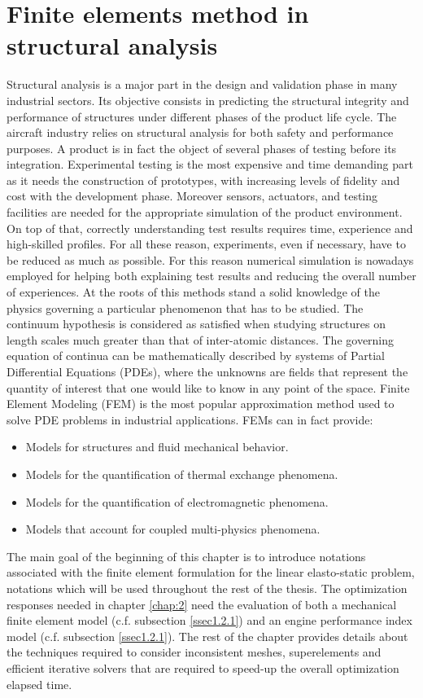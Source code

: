 \section{Finite elements method in structural analysis }
\label{sec:1.1}
Structural analysis is a major part in the design and validation phase in many industrial sectors. Its objective consists in predicting the structural integrity and performance of structures under different phases of the product life cycle.
The aircraft industry relies on structural analysis for both safety and performance purposes. A product is in fact the object of several phases of testing before its integration.
Experimental testing is the most expensive and time demanding part as it needs the construction of prototypes, with increasing levels of fidelity and cost with the development phase. Moreover sensors, actuators, and testing facilities are needed for the appropriate simulation of the product environment.
On top of that, correctly understanding test results requires time, experience and high-skilled profiles. 
For all these reason, experiments, even if necessary, have to be reduced as much as possible. For this reason numerical simulation is nowadays employed for helping both explaining test results and reducing the overall number of experiences. 
At the roots of this methods stand a solid knowledge of the physics governing a particular phenomenon that has to be studied. 
The continuum hypothesis is considered as satisfied when studying structures on length scales much greater than that of inter-atomic distances. 
The governing equation of continua can be mathematically described by systems of Partial Differential Equations (PDEs), where the unknowns are fields that represent the quantity of interest that one would like to know in any point of the space. 
Finite Element Modeling (FEM) is the most popular approximation method used to solve PDE problems in industrial applications.
FEMs can in fact provide:
\begin{itemize}
\item Models for structures and fluid mechanical behavior.
\item Models for the quantification of thermal exchange phenomena.
\item Models for the quantification of electromagnetic phenomena. 
\item Models that account for coupled multi-physics phenomena.
\end{itemize}
The main goal of the beginning of this chapter is to introduce notations associated with the finite element formulation for the linear elasto-static problem, notations which will be used throughout the rest of the thesis. The optimization responses needed in chapter \ref{chap:2} need the evaluation of both a mechanical finite element model (c.f. subsection \ref{ssec1.2.1}) and an engine performance index model (c.f. subsection \ref{ssec1.2.1}). The rest of the chapter provides details about the techniques required to consider inconsistent meshes, superelements and efficient iterative solvers that are required to speed-up the overall optimization elapsed time.

